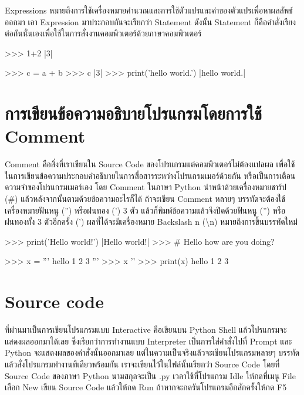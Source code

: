 Expressions หมายถึงการใช้เครื่องหมายคำนวณและการใช้ตัวแปรและค่าของตัวแปรเพื่อหาผลลัพธ์ออกมา เอา Expression มาประกอบกันจะเรียกว่า Statement ดังนั้น Statement ก็คือคำสั่งเรียงต่อกันนั่นเองเพื่อใช้ในการสั่งงานคอมพิวเตอร์ด้วยภาษาคอมพิวเตอร์

\begin{pycode}
>>> 1+2
|3|
\end{pycode}

\begin{pycode}
>>> c = a + b
>>> c
|3|
>>> print('hello world.')
|hello world.|

\end{pycode}


\section{การเขียนข้อความอธิบายโปรแกรมโดยการใช้ Comment}

Comment คือสิ่งที่เราเขียนใน Source Code ของโปรแกรมแต่คอมพิวเตอร์ไม่ต้องแปลผล เพื่อใช้ในการเขียนข้อความประกอบคำอธิบายในการสื่อสารระหว่างโปรแกรมเมอร์ด้วยกัน หรือเป็นการเตือนความจำของโปรแกรมเมอร์เอง โดย Comment ในภาษา Python นำหน้าด้วยเครื่องหมายชาร์ป (\#) แล้วหลังจากนั้นตามด้วยข้อความอะไรก็ได้ ถ้าจะเขียน Comment หลายๆ บรรทัดจะต้องใช้เครื่องหมายฟันหนู ('') หรือฝนทอง (')  3 ตัว แล้วก็พิมพ์ข้อความแล้วจึงปิดด้วยฟันหนู ('') หรือฝนทองทั้ง 3 ตัวอีกครั้ง (') ผลที่ได้จะมีเครื่องหมาย Backslash n (\textbackslash n) หมายถึงการขึ้นบรรทัดใหม่

\begin{pycode}
>>> print('Hello world!')
|Hello world!|
>>> # Hello how are you doing?
\end{pycode}

\begin{pycode}
>>> x = '''
hello
1
2
3
'''
>>> x
'\nhello{}\n'
>>> print(x)
hello
1
2
3
\end{pycode}


\section{Source code}

ที่ผ่านมาเป็นการเขียนโปรแกรมแบบ Interactive คือเขียนบน Python Shell แล้วโปรแกรมจะแสดงผลออกมาได้เลย ซึ่งเรียกว่าการทำงานแบบ Interpreter เป็นการใส่คำสั่งไปที่ Prompt และ Python จะแสดงผลของคำสั่งนั้นออกมาเลย แต่ในความเป็นจริงแล้วจะเขียนโปรแกรมหลายๆ บรรทัดแล้วสั่งโปรแกรมทำงานทีเดียวพร้อมกัน เราจะเขียนไว้ในไฟล์นั้นเรียกว่า Source Code โดยที่ Source Code ของภาษา Python นามสกุลจะเป็น .py เวลาใช้ที่โปรแกรม Idle ให้กดที่เมนู File เลือก New เขียน Source Code แล้วให้กด Run ถ้าหากจะกดรันโปรแกรมอีกสักครั้งให้กด F5


